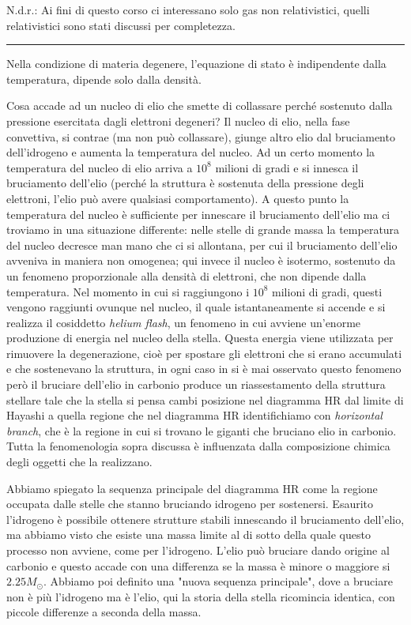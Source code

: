 N.d.r.: Ai fini di questo corso ci interessano solo gas non relativistici, quelli relativistici sono stati discussi per completezza.

\rule[7pt]{\linewidth}{0.4pt}

Nella condizione di materia degenere, l'equazione di stato è indipendente dalla temperatura, dipende solo dalla densità.

Cosa accade ad un nucleo di elio che smette di collassare perché sostenuto dalla pressione esercitata dagli elettroni degeneri? Il nucleo di elio, nella fase convettiva, si contrae (ma non può collassare), giunge altro elio dal bruciamento dell'idrogeno e aumenta la temperatura del nucleo. Ad un certo momento la temperatura del nucleo di elio arriva a $10^8$ milioni di gradi e si innesca il bruciamento dell'elio (perché la struttura è sostenuta della pressione degli elettroni, l'elio può avere qualsiasi comportamento). A questo punto la temperatura del nucleo è sufficiente per innescare il bruciamento dell'elio ma ci troviamo in una situazione differente: nelle stelle di grande massa la temperatura del nucleo decresce man mano che ci si allontana, per cui il bruciamento dell'elio avveniva in maniera non omogenea; qui invece il nucleo è isotermo, sostenuto da un fenomeno proporzionale alla densità di elettroni, che non dipende dalla temperatura. Nel momento in cui si raggiungono i $10^8$ milioni di gradi, questi vengono raggiunti ovunque nel nucleo, il quale istantaneamente si accende e si realizza il cosiddetto \textit{helium flash}, un fenomeno in cui avviene un'enorme produzione di energia nel nucleo della stella. Questa energia viene utilizzata per rimuovere la degenerazione, cioè per spostare gli elettroni che si erano accumulati e che sostenevano la struttura, in ogni caso in si è mai osservato questo fenomeno però il bruciare dell'elio in carbonio produce un riassestamento della struttura stellare tale che la stella si pensa cambi posizione nel diagramma HR dal limite di Hayashi a quella regione che nel diagramma HR identifichiamo con \textit{horizontal branch}, che è la regione in cui si trovano le giganti che bruciano elio in carbonio. Tutta la fenomenologia sopra discussa è influenzata dalla composizione chimica degli oggetti che la realizzano.

\vspace{0.2cm}Abbiamo spiegato la sequenza principale del diagramma HR come la regione occupata dalle stelle che stanno bruciando idrogeno per sostenersi. Esaurito l'idrogeno è possibile ottenere strutture stabili innescando il bruciamento dell'elio, ma abbiamo visto che esiste una massa limite al di sotto della quale questo processo non avviene, come per l'idrogeno. L'elio può bruciare dando origine al carbonio e questo accade con una differenza se la massa è minore o maggiore si $2.25M_{\odot}$. Abbiamo poi definito una "nuova sequenza principale", dove a bruciare non è più l'idrogeno ma è l'elio, qui la storia della stella ricomincia identica, con piccole differenze a seconda della massa.

